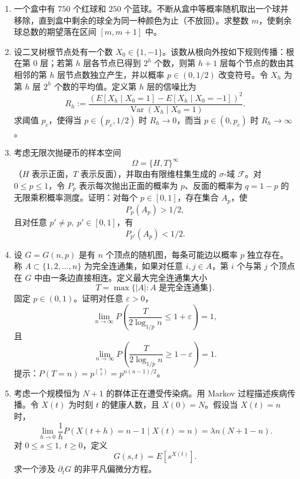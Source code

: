 \documentclass[UTF8,12pt]{ctexart}
\begin{document}
\begin{enumerate}[label=\textbf{\arabic*.},leftmargin=2.2em]
\item 一个盒中有 \(750\) 个红球和 \(250\) 个蓝球。不断从盒中等概率随机取出一个球并移除，直到盒中剩余的球全为同一种颜色为止（不放回）。求整数 \(m\)，使剩余球总数的期望落在区间 \([m,m+1]\) 中。

\item 设二叉树根节点处有一个数 \(X_0\in\{1,-1\}\)。该数从根向外按如下规则传播：根在第 \(0\) 层；若第 \(h\) 层各节点已得到 \(2^h\) 个数，则第 \(h+1\) 层每个节点的数由其相邻的第 \(h\) 层节点数独立产生，并以概率 \(p\in(0,1/2)\) 改变符号。令 \(X_h\) 为第 \(h\) 层 \(2^h\) 个数的平均值。定义第 \(h\) 层的信噪比为
\[
R_h:=\frac{\left(E[X_h\mid X_0=1]-E[X_h\mid X_0=-1]\right)^2}
{\operatorname{Var}(X_h\mid X_0=1)}.
\]
求阈值 \(p_c\)，使得当 \(p\in(p_c,1/2)\) 时 \(R_h\to0\)，而当 \(p\in(0,p_c)\) 时 \(R_h\to\infty\)。

\item 考虑无限次抛硬币的样本空间
\[
\Omega=\{H,T\}^{\infty}
\]
（\(H\) 表示正面，\(T\) 表示反面），并取由有限维柱集生成的 \(\sigma\)-域 \(\mathcal F\)。对 \(0\le p\le1\)，令 \(P_p\) 表示每次抛出正面的概率为 \(p\)、反面的概率为 \(q=1-p\) 的无限乘积概率测度。证明：对每个 \(p\in[0,1]\)，存在集合 \(A_p\)，使
\[
P_p(A_p)>1/2,
\]
且对任意 \(p'\ne p,\ p'\in[0,1]\)，有
\[
P_{p'}(A_p)<1/2.
\]

\item 设 \(G=G(n,p)\) 是有 \(n\) 个顶点的随机图，每条可能边以概率 \(p\) 独立存在。称 \(A\subset\{1,2,\ldots,n\}\) 为完全连通集，如果对任意 \(i,j\in A\)，第 \(i\) 个与第 \(j\) 个顶点在 \(G\) 中由一条边直接相连。定义最大完全连通集大小
\[
T=\max\{|A|:A\text{ 是完全连通集}\}.
\]
固定 \(p\in(0,1)\)。证明对任意 \(\varepsilon>0\)，
\[
\lim_{n\to\infty}P\left(\frac{T}{2\log_{1/p}n}\le1+\varepsilon\right)=1,
\]
且
\[
\lim_{n\to\infty}P\left(\frac{T}{2\log_{1/p}n}\ge1-\varepsilon\right)=1.
\]
提示：\(P(T=n)=p^{\binom n2}=p^{n(n-1)/2}\)。

\item 考虑一个规模恒为 \(N+1\) 的群体正在遭受传染病。用 Markov 过程描述疾病传播。令 \(X(t)\) 为时刻 \(t\) 的健康人数，且 \(X(0)=N\)。假设当 \(X(t)=n\) 时，
\[
\lim_{h\to0}\frac1hP(X(t+h)=n-1\mid X(t)=n)=\lambda n(N+1-n).
\]
对 \(0\le s\le1,\ t\ge0\)，定义
\[
G(s,t)=E[s^{X(t)}].
\]
求一个涉及 \(\partial_tG\) 的非平凡偏微分方程。
\end{enumerate}
\end{document}
